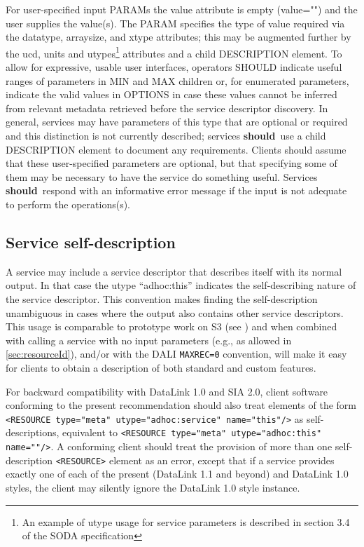 \documentclass[11pt,a4paper]{ivoa}
\newcommand{\attval}[2]{#1={\allowbreak}{"}#2{"}}
\newcommand{\rfcshould}{\textbf{should}}
\begin{document}
For user-specified input PARAMs the value attribute is empty (\attval{value}{})
and the user supplies the value(s). The PARAM specifies the type of value required via
the datatype, arraysize, and xtype attributes; this may be augmented further by the ucd,
 units and utypes\footnote{An example of utype usage for service
parameters is described in section 3.4 of the SODA specification} attributes
and a child DESCRIPTION element. To allow for expressive, usable user
interfaces, operators SHOULD indicate useful ranges of parameters in MIN and MAX children
or, for enumerated parameters, indicate the valid values in OPTIONS  in case
these values cannot be inferred from relevant metadata retrieved
before the service descriptor discovery. In general, services
may have parameters of this type that are optional or required and this distinction is
not currently described; services \rfcshould\ use a child DESCRIPTION element to document any
requirements. Clients should assume that these user-specified parameters are optional, but
that specifying some of them may be necessary to have the service do something useful.
Services \rfcshould\ respond with an informative error message if the input is not adequate to
perform the operations(s).

\subsection{Service self-description}
\label{sec:selfDescribing}
A service may include a service descriptor that describes itself with
its normal output.
In that case the utype ``adhoc:this'' indicates the self-describing
nature of the service descriptor.
This convention makes finding the self-description unambiguous in
cases where the output also contains other service descriptors.
This usage is comparable to prototype work on S3
(see \citet{note:s3})
and when combined with calling a service with no input parameters
(e.g., as allowed in \ref{sec:resourceId}),
and/or with the DALI \texttt{MAXREC=0} convention,
will make it easy for clients to obtain a
description of both standard and custom features.

For backward compatibility with DataLink 1.0 and SIA 2.0, client software
conforming to the present recommendation should also treat elements of
the form \verb|<RESOURCE type="meta" utype="adhoc:service" name="this"/>|
as self-descriptions, equivalent to
\verb|<RESOURCE type="meta" utype="adhoc:this" name=""/>|.
A conforming client should treat the provision of more than one
self-description \texttt{<RESOURCE>} element as an error, except that if a
service provides exactly one of each of the present (DataLink 1.1 and
beyond) and DataLink 1.0 styles, the client may silently ignore the
DataLink 1.0 style instance.
\end{document}
